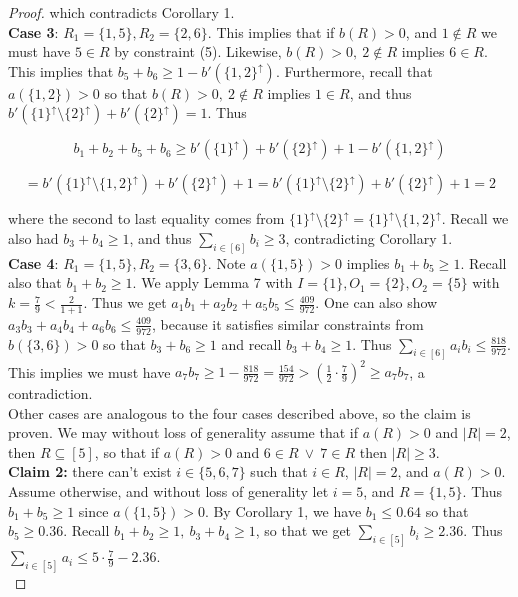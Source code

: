 \documentclass{article}
\begin{document}
\begin{proof}
\noindent
which contradicts Corollary 1. \\

\textbf{Case 3}: $R_1 = \{1,5\}, R_2 = \{2,6\}$. This implies that if $b(R) > 0$, and $1 \not \in R$ we must have $5 \in R$ by constraint (5). Likewise, $b(R) > 0, \ 2 \not \in R$ implies $6 \in R$. This implies that $b_5 + b_6 \geq 1 - b'(\{1,2\}^{\uparrow})$. Furthermore, recall that $a(\{1,2\}) > 0$ so that $b(R) > 0, \ 2 \not\in R$ implies $1 \in R$, and thus $ b'(\{1\}^{\uparrow} \setminus \{2\}^{\uparrow}) + b'(\{2\}^{\uparrow}) = 1$. Thus

$$b_1+b_2+b_5+b_6 \geq  b'(\{1\}^{\uparrow}) + b'(\{2\}^{\uparrow}) + 1 - b'(\{1,2\}^{\uparrow}) $$

$$=  b'(\{1\}^{\uparrow} \setminus \{1,2\}^{\uparrow}) + b'(\{2\}^{\uparrow}) + 1  = b'(\{1\}^{\uparrow} \setminus \{2\}^{\uparrow}) + b'(\{2\}^{\uparrow}) + 1 = 2$$

\noindent
where the second to last equality comes from $\{1\}^{\uparrow} \setminus \{2\}^{\uparrow} = \{1\}^{\uparrow} \setminus \{1,2\}^{\uparrow}$. Recall we also had $b_3 + b_4 \geq 1$, and thus $\sum_{i \in [6]} b_i \geq 3$, contradicting Corollary 1. \\

\textbf{Case 4}: $R_1 = \{1,5\}, R_2 = \{3,6\}$. Note $a(\{1,5\}) > 0$ implies $b_1 + b_5 \geq 1$. Recall also that $b_1 + b_2 \geq 1$. We apply Lemma 7 with $I = \{1\}, O_1 = \{2\}, O_2 = \{5\}$ with $k = \frac{7}{9} < \frac{2}{1+1}$. Thus we get $a_1b_1 + a_2b_2 + a_5b_5 \leq  \frac{409}{972}$. One can also show $a_3b_3 + a_4b_4 + a_6b_6 \leq \frac{409}{972}$, because it satisfies similar constraints from $b(\{3,6\}) > 0$ so that $b_3 + b_6 \geq 1$ and recall $b_3 + b_4 \geq 1$. Thus $\sum_{i \in [6]} a_ib_i \leq \frac{818}{972}$. This implies we must have $a_7b_7 \geq 1-\frac{818}{972} = \frac{154}{972} > (\frac{1}{2} \cdot \frac{7}{9})^2 \geq a_7b_7$, a contradiction. \\

Other cases are analogous to the four cases described above, so the claim is proven. We may without loss of generality assume that if $a(R) > 0$ and $|R| = 2$, then $R \subseteq [5]$, so that if $a(R) > 0$  and $6 \in R \ \vee \  7 \in R$ then $|R| \geq 3$. \\

\textbf{Claim 2:} there can't exist $i \in \{5,6,7\}$ such that $i \in R$, $|R| = 2$, and $a(R) > 0$. Assume otherwise, and without loss of generality let $i = 5$, and $R = \{1,5\}$. Thus $b_1 + b_5 \geq 1$ since $a(\{1,5\}) > 0$. By Corollary 1, we have $b_1 \leq 0.64$ so that $b_5 \geq 0.36$. Recall $b_1 + b_2 \geq 1, \ b_3 + b_4 \geq 1$, so that we get $\sum_{i \in [5]} b_i \geq 2.36$. Thus $\sum_{i \in [5]} a_i \leq 5 \cdot \frac{7}{9} - 2.36$. \\


\end{proof}
\end{document}
